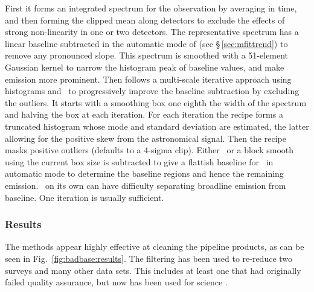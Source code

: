 \documentclass[final,authoryear,5p,times,twocolumn]{elsarticle}
\begin{document}
First it forms an integrated spectrum for the observation by averaging
in time, and then forming the clipped mean along detectors to exclude
the effects of strong non-linearity in one or two detectors.  The
representative spectrum has a linear baseline subtracted in the
automatic mode of \mfittrend (see \S\,\ref{sec:mfittrend}) to remove
any pronounced slope.  This spectrum is smoothed with a 51-element
Gaussian kernel to narrow the histogram peak of baseline values, and
make emission more prominent.  Then follows a multi-scale iterative
approach using histograms and \mfittrend\ to progressively improve the
baseline subtraction by excluding the outliers.  It starts with a
smoothing box one eighth the width of the spectrum and halving the box
at each iteration.  For each iteration the recipe forms a truncated
histogram whose mode and standard deviation are estimated, the latter
allowing for the positive skew from the astronomical signal.  Then the
recipe masks positive outliers (defaults to a 4-sigma clip).  Either
\findback\ or a block smooth using the current box size is subtracted
to give a flattish baseline for \mfittrend\ in automatic mode to
determine the baseline regions and hence the remaining emission.
\mfittrend\ on its own can have difficulty separating broadline
emission from baseline.  One iteration is usually sufficient.

\subsubsection{Results}

The methods appear highly effective at cleaning the pipeline products,
as can be seen in Fig.~\ref{fig:badbase:results}. \citep[See][for
details of earlier reductions of these data.]{2010MNRAS.401..455C} The
filtering has been used to re-reduce two surveys and many other data
sets. This includes at least one that had originally failed quality
assurance, but now has been used for science
\citep{2013ApJ...767..126S}.
\end{document}
